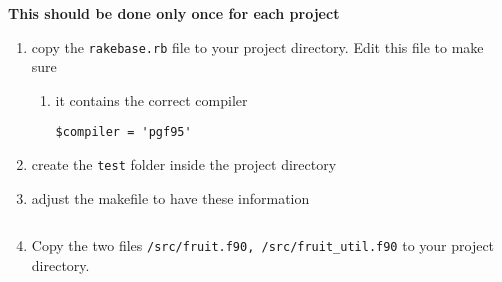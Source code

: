 {\bf This should be done only once for each project}
\begin{enumerate}

\item copy the \verb!rakebase.rb! file to your project directory. Edit
  this file to make sure 
  \begin{enumerate}
  \item it contains the correct compiler
\begin{verbatim}
$compiler = 'pgf95'
\end{verbatim}


\end{enumerate}

\item create the \verb!test! folder inside the project directory

\item adjust the makefile to have these information
\begin{verbatim}

\end{verbatim}

\item Copy the two files \verb!/src/fruit.f90, /src/fruit_util.f90! to
  your project directory.



\end{enumerate}
